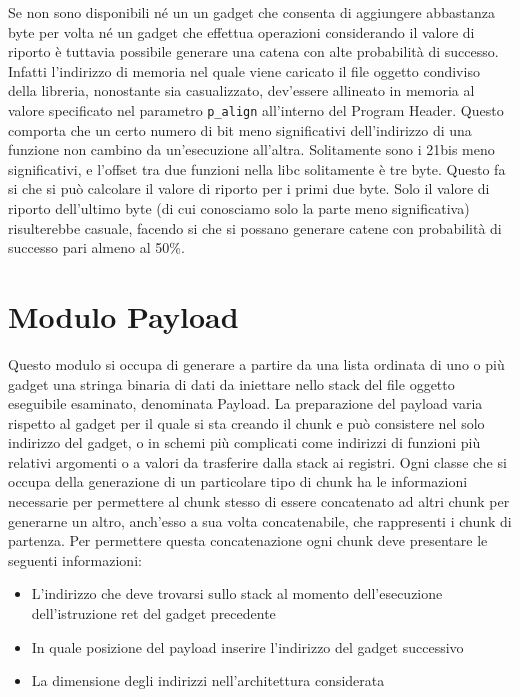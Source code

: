 Se non sono disponibili né un un gadget che consenta di aggiungere
abbastanza byte per volta né un gadget che effettua operazioni
considerando il valore di riporto è tuttavia possibile generare una
catena con alte probabilità di successo. Infatti l'indirizzo di
memoria nel quale viene caricato il file oggetto condiviso della
libreria, nonostante sia casualizzato, dev'essere allineato in memoria
al valore specificato nel parametro \lstinline{p_align} all'interno
del Program Header. Questo comporta che un certo numero di bit meno
significativi dell'indirizzo di una funzione non cambino da
un'esecuzione all'altra. Solitamente sono i 21bis meno significativi,
e l'offset tra due funzioni nella libc solitamente è tre byte. Questo
fa si che si può calcolare il valore di riporto per i primi due
byte. Solo il valore di riporto dell'ultimo byte (di cui conosciamo
solo la parte meno significativa) risulterebbe casuale, facendo si che
si possano generare catene con probabilità di successo pari almeno al
50\%.


\section{Modulo Payload}

Questo modulo si occupa di generare a partire da una lista ordinata di
uno o più gadget una stringa binaria di dati da iniettare nello stack
del file oggetto eseguibile esaminato, denominata Payload. La
preparazione del payload varia rispetto al gadget per il quale si sta
creando il chunk e può consistere nel solo indirizzo del gadget, o in
schemi più complicati come indirizzi di funzioni più relativi
argomenti o a valori da trasferire dalla stack ai registri. Ogni
classe che si occupa della generazione di un particolare tipo di chunk
ha le informazioni necessarie per permettere al chunk stesso di essere
concatenato ad altri chunk per generarne un altro, anch'esso a sua
volta concatenabile, che rappresenti i chunk di partenza. Per
permettere questa concatenazione ogni chunk deve presentare le
seguenti informazioni:


\begin{itemize}

\item L'indirizzo che deve trovarsi sullo stack al momento
  dell'esecuzione dell'istruzione ret del gadget precedente 

\item In quale posizione del payload inserire l'indirizzo del gadget
  successivo

\item La dimensione degli indirizzi nell'architettura considerata

\end{itemize}


